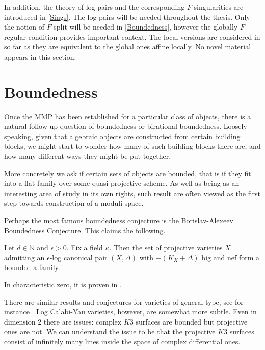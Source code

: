 \documentclass[a4paper,12pt]{book}
\let \OldSection \section
\renewcommand{\section}[1]{\OldSection{#1} \thispagestyle{section}}
\begin{document}
	In addition, the theory of log pairs and the corresponding $F$-singularities are introduced in \autoref{Sings}. The log pairs will be needed throughout the thesis. Only the notion of $F$-split will be needed in \autoref{Boundedness}, however the globally $F$-regular condition provides important context. The local versions are considered in so far as they are equivalent to the global ones affine locally. No novel material appears in this section.
	
	\section{Boundedness}
	
	Once the MMP has been established for a particular class of objects, there is a natural follow up question of boundedness or birational boundedness. Loosely speaking, given that algebraic objects are constructed from certain building blocks, we might start to wonder how many of such building blocks there are, and how many different ways they might be put together.
	
	More concretely we ask if certain sets of objects are bounded, that is if they fit into a flat family over some quasi-projective scheme. As well as being as an interesting area of study in its own rights, such result are often viewed as the first step towards construction of a moduli space.
	
	Perhaps the most famous boundedness conjecture is the Borislav-Alexeev Boundedness Conjecture. This claims the following.
	
	\begin{conjecture*}
		Let $d \in \mathbb{N}$ and $\epsilon > 0$. Fix a field $\kappa$. Then the set of projective varieties $X$ admitting an $\epsilon$-log canonical pair $(X,\Delta)$ with $-(K_{X}+\Delta)$ big and nef form a bounded a family.
	\end{conjecture*}	
	
	In characteristic zero, it is proven in \cite[Theorem 1.1]{birkar2016singularities}.
	
	There are similar results and conjectures for varieties of general type, see for instance \cite{HMX18}. Log Calabi-Yau varieties, however, are somewhat more subtle. Even in dimension 2 there are issues: complex $K3$ surfaces are bounded but projective ones are not. We can understand the issue to be that the projective $K3$ surfaces consist of infinitely many lines inside the space of complex differential ones.
	
\end{document}
